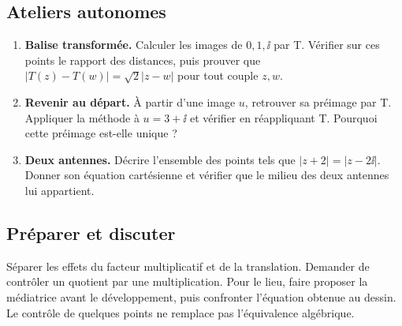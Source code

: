 \subsection{Ateliers autonomes}
\begin{enumerate}
\item \textbf{Balise transformée.} Calculer les images de $0,1,\ii$ par T. Vérifier sur ces points le rapport des distances, puis prouver que $|T(z)-T(w)|=\sqrt2|z-w|$ pour tout couple $z,w$.
\item \textbf{Revenir au départ.} À partir d'une image $u$, retrouver sa préimage par T. Appliquer la méthode à $u=3+\ii$ et vérifier en réappliquant T. Pourquoi cette préimage est-elle unique ?
\item \textbf{Deux antennes.} Décrire l'ensemble des points tels que $|z+2|=|z-2\ii|$. Donner son équation cartésienne et vérifier que le milieu des deux antennes lui appartient.
\end{enumerate}
\ifprof
\subsection{Préparer et discuter}
Séparer les effets du facteur multiplicatif et de la translation. Demander de contrôler un quotient par une multiplication. Pour le lieu, faire proposer la médiatrice avant le développement, puis confronter l'équation obtenue au dessin. Le contrôle de quelques points ne remplace pas l'équivalence algébrique.

\fi
